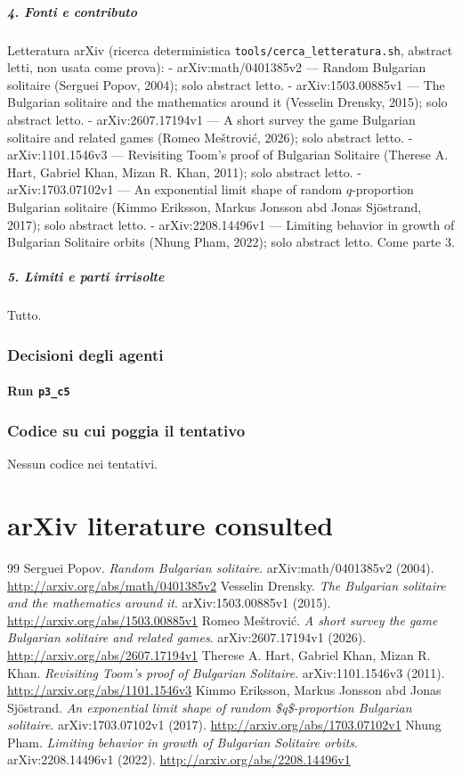 \documentclass[11pt,a4paper]{article}
\begin{document}
\subparagraph{4. Fonti e contributo}\label{fonti-e-contributo}

Letteratura arXiv (ricerca deterministica
\texttt{tools/cerca\_letteratura.sh}, abstract letti, non usata come
prova): - arXiv:math/0401385v2 --- Random Bulgarian solitaire (Serguei
Popov, 2004); solo abstract letto. - arXiv:1503.00885v1 --- The
Bulgarian solitaire and the mathematics around it (Vesselin Drensky,
2015); solo abstract letto. - arXiv:2607.17194v1 --- A short survey the
game Bulgarian solitaire and related games (Romeo Meštrović, 2026); solo
abstract letto. - arXiv:1101.1546v3 --- Revisiting Toom's proof of
Bulgarian Solitaire (Therese A. Hart, Gabriel Khan, Mizan R. Khan,
2011); solo abstract letto. - arXiv:1703.07102v1 --- An exponential
limit shape of random \(q\)-proportion Bulgarian solitaire (Kimmo
Eriksson, Markus Jonsson abd Jonas Sjöstrand, 2017); solo abstract
letto. - arXiv:2208.14496v1 --- Limiting behavior in growth of Bulgarian
Solitaire orbits (Nhung Pham, 2022); solo abstract letto. Come parte 3.

\subparagraph{5. Limiti e parti
irrisolte}\label{limiti-e-parti-irrisolte}

Tutto.

\subsubsection{Decisioni degli agenti}
\paragraph{Run \texttt{p3\_c5}}

\subsubsection{Codice su cui poggia il tentativo}
Nessun codice nei tentativi.

\section{arXiv literature consulted}
\begin{thebibliography}{99}
 Serguei Popov. \emph{Random Bulgarian solitaire}. arXiv:math/0401385v2 (2004). \url{http://arxiv.org/abs/math/0401385v2}
 Vesselin Drensky. \emph{The Bulgarian solitaire and the mathematics around it}. arXiv:1503.00885v1 (2015). \url{http://arxiv.org/abs/1503.00885v1}
 Romeo Meštrović. \emph{A short survey the game Bulgarian solitaire and related games}. arXiv:2607.17194v1 (2026). \url{http://arxiv.org/abs/2607.17194v1}
 Therese A. Hart, Gabriel Khan, Mizan R. Khan. \emph{Revisiting Toom's proof of Bulgarian Solitaire}. arXiv:1101.1546v3 (2011). \url{http://arxiv.org/abs/1101.1546v3}
 Kimmo Eriksson, Markus Jonsson abd Jonas Sjöstrand. \emph{An exponential limit shape of random \$q\$-proportion Bulgarian solitaire}. arXiv:1703.07102v1 (2017). \url{http://arxiv.org/abs/1703.07102v1}
 Nhung Pham. \emph{Limiting behavior in growth of Bulgarian Solitaire orbits}. arXiv:2208.14496v1 (2022). \url{http://arxiv.org/abs/2208.14496v1}
\end{thebibliography}
\end{document}
